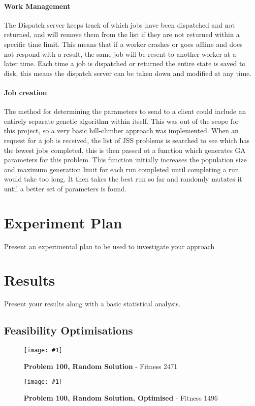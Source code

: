 \documentclass[14pt]{acmsiggraph}
\newcommand{\figuremacroW}[4]{
	\begin{figure}[h] %
		\centering
		\texttt{[image: \#1]}
		\caption[#2]{\textbf{#2} - #3}
		\label{fig:#1}
	\end{figure}
}
\begin{document}
	\paragraph{Work Management}
	The Dispatch server keeps track of which jobs have been dispatched and not returned, and will remove them from the list if they are not returned within a specific time limit. This means that if a worker crashes or goes offline and does not respond with a result, the same job will be resent to another worker at a later time. Each time a job is dispatched or returned the entire state is saved to disk, this means the dispatch server can be taken down and modified at any time.
	
	\paragraph{Job creation}
	The method for determining the parameters to send to a client could include an entirely separate genetic algorithm within itself. This was out of the scope for this project, so a very basic hill-climber approach was implemented. When an request for a job is received, the list of JSS problems is searched to see which has the fewest jobs completed, this is then passed ot a function which generates GA parameters for this problem. This function initially increases the population size and maximum generation limit for each run completed until completing a run would take too long. It then takes the best run so far and randomly mutates it until a better set of parameters is found.
	
	\section{Experiment Plan}
	Present an experimental plan to be used to investigate your approach
	
	\section{Results}
	Present your results along with a basic statistical analysis.
	
	\subsection{Feasibility Optimisations}
	\figuremacroW
	{p100rnd}
	{Problem 100, Random Solution}
	{Fitness 2471}
	{1.0}
	\figuremacroW
	{p100rndopt}
	{Problem 100, Random Solution, Optimised}
	{Fitness 1496}
	{1.0}
	
\end{document}
